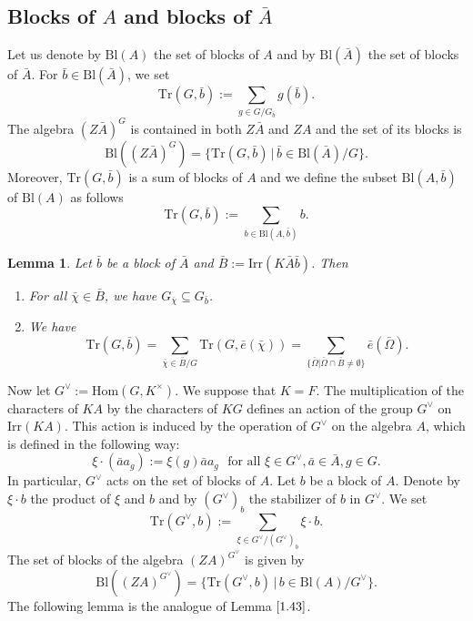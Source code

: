 \documentclass[10pt,a4paper,titlepage]{article}
\newtheorem{lemma}[theorem]{Lemma}
\begin{document}
\subsection*{\normalsize Blocks of $A$ and blocks of $\bar{A}$}

Let us denote by $\mathrm{Bl}(A)$ the set of blocks of $A$ and by
$\mathrm{Bl}(\bar{A})$ the set of blocks of $\bar{A}$. For $\bar{b}
\in \mathrm{Bl}(\bar{A})$, we set
$$\mathrm{Tr}(G,\bar{b}):=\sum_{g \in G/G_{\bar{b}}}g(\bar{b}).$$
The algebra $(Z\bar{A})^G$ is contained in both $Z\bar{A}$ and $ZA$
and the set of its blocks is
$$\mathrm{Bl}((Z\bar{A})^G)=\{\mathrm{Tr}(G,\bar{b}) \,|\, \bar{b} \in
\mathrm{Bl}(\bar{A})/G\}.$$ Moreover, $\mathrm{Tr}(G,\bar{b})$ is a
sum of blocks of $A$ and we define the subset
$\mathrm{Bl}(A,\bar{b})$ of $\mathrm{Bl}(A)$ as follows
$$\mathrm{Tr}(G,\bar{b}):=\sum_{b \in \mathrm{Bl}(A,\bar{b})}b.$$

\begin{lemma}\label{1.43}
Let $\bar{b}$ be a block of $\bar{A}$ and
$\bar{B}:=\mathrm{Irr}(K\bar{A}\bar{b})$. Then
\begin{enumerate}[(1)]
  \item For all $\bar{\chi} \in \bar{B}$, we have $G_{\bar{\chi}}
  \subseteq G_{\bar{b}}$.
  \item We have
  $$\mathrm{Tr}(G,\bar{b})=\sum_{\bar{\chi} \in \bar{B}/G}
  \mathrm{Tr}(G,\bar{e}(\bar{\chi}))=
  \sum_{\{\bar{\Omega}|\bar{\Omega} \cap \bar{B} \neq \emptyset \}}\bar{e}(\bar{\Omega}).$$
\end{enumerate}
\end{lemma}


Now let $G^\vee:=\mathrm{Hom}(G,K^\times)$. We suppose that $K=F$.
The multiplication of the characters of $KA$ by the characters of
$KG$ defines an action of the group $G^\vee$ on $\mathrm{Irr}(KA)$.
This action is induced by the operation of $G^\vee$ on the algebra
$A$, which is defined in the following way:
$$ \xi \cdot (\bar{a}a_g) := \xi(g)\bar{a}a_g \,\,\textrm{ for all }
\xi \in G^\vee, \bar{a} \in \bar{A}, g \in G.$$ In particular,
$G^\vee$ acts on the set of blocks of $A$. Let $b$ be a block of
$A$. Denote by $\xi \cdot b$ the product of $\xi$ and $b$ and by
$(G^\vee)_b$ the stabilizer of $b$ in $G^\vee$. We set
$$\mathrm{Tr}(G^\vee,b):=\sum_{\xi\in G^\vee/(G^\vee)_b}\xi\cdot b.$$
The set of blocks of the algebra $(ZA)^{G^\vee}$ is given by
$$\mathrm{Bl}((ZA)^{G^\vee})=\{\mathrm{Tr}(G^\vee,b) \,|\, b \in
\mathrm{Bl}(A)/G^\vee\}.$$
The following lemma is the analogue of Lemma $\ref{1.43}$.
\end{document}
